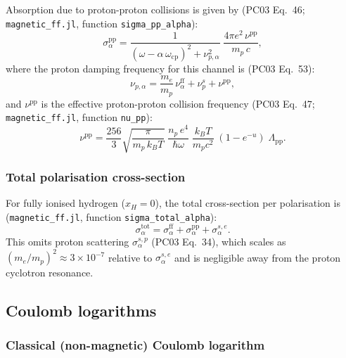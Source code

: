 \noindent
Absorption due to proton-proton collisions is given by
(PC03 Eq.~46; \texttt{magnetic\_ff.jl}, function
\texttt{sigma\_pp\_alpha}):
%
\begin{equation}
\label{eq:sigma_pp}
\sigma_\alpha^{\mathrm{pp}}
  = \frac{1}{(\omega - \alpha\,\omega_{\mathrm{cp}})^2
         + \nu_{p,\alpha}^2}\;
    \frac{4\pi e^2\,\nu^{\mathrm{pp}}}{m_p\,c},
\end{equation}
%
where the proton damping frequency for this channel is
(PC03 Eq.~53):
%
\begin{equation}
\label{eq:nu_p_alpha}
\nu_{p,\alpha}
  = \frac{m_e}{m_p}\,\nu_\alpha^{\mathrm{ff}}
  + \nu_p^s + \nu^{\mathrm{pp}},
\end{equation}
%
and $\nu^{\mathrm{pp}}$ is the effective proton-proton collision frequency
(PC03 Eq.~47; \texttt{magnetic\_ff.jl}, function \texttt{nu\_pp}):
%
\begin{equation}
\label{eq:nu_pp}
\nu^{\mathrm{pp}}
  = \frac{256}{3}\sqrt{\frac{\pi}{m_p\,k_B T}}\;
    \frac{n_p\,e^4}{\hbar\omega}\;
    \frac{k_B T}{m_p c^2}\;
    (1-e^{-u})\;\Lambda_{\mathrm{pp}}.
\end{equation}

\subsubsection{Total polarisation cross-section}
\label{sec:opacity:mag:total_alpha}

\noindent
For fully ionised hydrogen ($x_H = 0$), the total cross-section per
polarisation is (\texttt{magnetic\_ff.jl}, function
\texttt{sigma\_total\_alpha}):
%
\begin{equation}
\label{eq:sigma_total_alpha}
\sigma_\alpha^{\mathrm{tot}}
  = \sigma_\alpha^{\mathrm{ff}}
  + \sigma_\alpha^{\mathrm{pp}}
  + \sigma_\alpha^{s,e}.
\end{equation}
%
This omits proton scattering $\sigma_\alpha^{s,p}$ (PC03 Eq.~34), which
scales as $(m_e/m_p)^2\approx 3\times 10^{-7}$ relative to
$\sigma_\alpha^{s,e}$ and is negligible away from the proton cyclotron
resonance.


\subsection{Coulomb logarithms}
\label{sec:opacity:coulomb}

\subsubsection{Classical (non-magnetic) Coulomb logarithm}
\label{sec:opacity:coulomb:classical}

